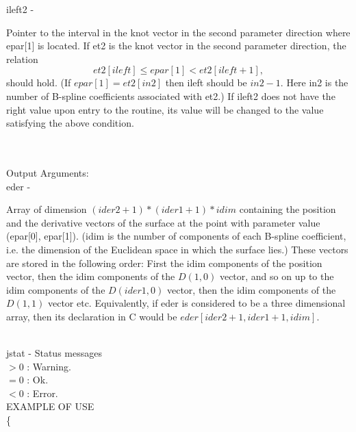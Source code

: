         \>\>    {\fov ileft2}\> - \>
        \begin{minipg2}
          Pointer to the interval in the knot vector
          in the second parameter direction where {\fov epar}[1]
          is located. If {\fov et2} is the knot vector in the second
          parameter direction, the relation
          \[
          et2[ileft]\leq epar[1] < et2[ileft+1],
          \]
          should hold. (If $epar[1]=et2[in2]$ then {\fov ileft} should
          be $in2-1$. Here {\fov in2} is the number of B-spline
          coefficients associated with {\fov et2}.)
          If {\fov ileft2} does not have the right value upon
          entry to the routine, its value will be changed
          to the value satisfying the above condition.
        \end{minipg2}\\[0.8ex]
\\
        \>Output Arguments:\\
        \>\>    {\fov eder}\> - \>
        \begin{minipg2}
          Array of dimension $(ider2+1)*(ider1+1)*idim$
          containing the position and the derivative vectors
          of the surface at the point with parameter value
          ({\fov epar}[0], {\fov epar}[1]).
          ({\fov idim} is the number of components of each B-spline
          coefficient, i.e. the dimension of the Euclidean
          space in which the surface lies.)
          These vectors are stored in the following order:
          First the {\fov idim} components of the position vector,
          then the {\fov idim} components of the $D(1,0)$ vector,
          and so on up to the {\fov idim} components of the $D(ider1,0)$
          vector,
          then the {\fov idim} components of the $D(1,1)$ vector etc.
          Equivalently, if {\fov eder} is considered to be a
          three dimensional array, then its declaration in C
          would be $eder[ider2+1,ider1+1,idim]$.
        \end{minipg2}\\[0.8ex]
        \>\>    {\fov jstat}     \> - \> Status messages\\
                \>\>\>\>\>      $> 0$ : \>      Warning.\\
                \>\>\>\>\>      $= 0$ : \>      Ok.\\
                \>\>\>\>\>      $< 0$ : \>      Error.\\
\newpagetabs
EXAMPLE OF USE\\
        \>      \{ \\
